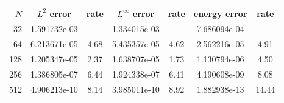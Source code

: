 \begin{tabular}{rcccccc}
\hline
$N$ & $L^2$ error & rate & $L^\infty$ error & rate & energy error & rate \\
\hline
32 & 1.591732e-03 & -- & 1.334015e-03 & -- & 7.686094e-04 & -- \\
64 & 6.213671e-05 & 4.68 & 5.435357e-05 & 4.62 & 2.562216e-05 & 4.91 \\
128 & 1.205347e-05 & 2.37 & 1.638707e-05 & 1.73 & 1.130794e-06 & 4.50 \\
256 & 1.386805e-07 & 6.44 & 1.924338e-07 & 6.41 & 4.190608e-09 & 8.08 \\
512 & 4.906213e-10 & 8.14 & 3.985011e-10 & 8.92 & 1.882938e-13 & 14.44 \\
\hline
\end{tabular}
